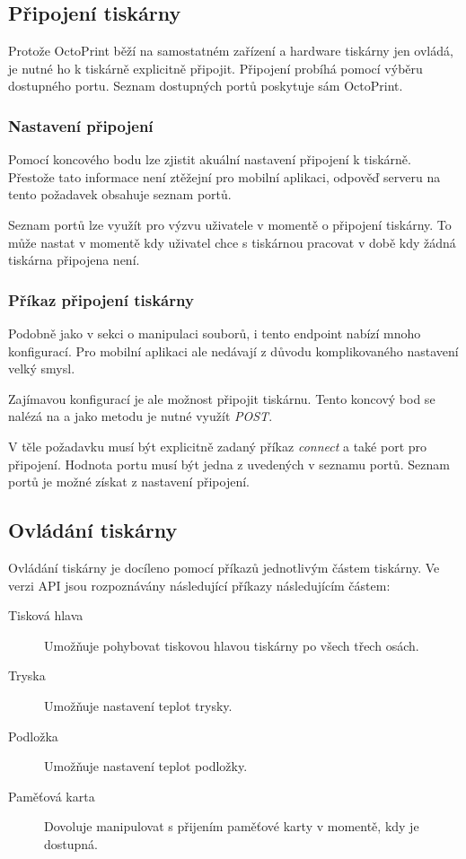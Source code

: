 \subsection{Připojení tiskárny}

Protože OctoPrint běží na samostatném zařízení a hardware tiskárny jen ovládá, je nutné ho k tiskárně explicitně připojit.
Připojení probíhá pomocí výběru dostupného portu.
Seznam dostupných portů poskytuje sám OctoPrint.

\subsubsection*{Nastavení připojení}

Pomocí koncového bodu  lze zjistit akuální nastavení připojení k tiskárně.
Přestože tato informace není ztěžejní pro mobilní aplikaci, odpověď serveru na tento požadavek obsahuje seznam portů.

Seznam portů lze využít pro výzvu uživatele v momentě o připojení tiskárny.
To může nastat v momentě kdy uživatel chce s tiskárnou pracovat v době kdy žádná tiskárna připojena není.

\subsubsection*{Příkaz připojení tiskárny}

Podobně jako v sekci o manipulaci souborů, i tento endpoint nabízí mnoho konfigurací.
Pro mobilní aplikaci ale nedávají z důvodu komplikovaného nastavení velký smysl.

Zajímavou konfigurací je ale možnost připojit tiskárnu.
Tento koncový bod se nalézá na  a jako metodu je nutné využít \textit{POST}.

V těle požadavku musí být explicitně zadaný příkaz \textit{connect} a také port pro připojení.
Hodnota portu musí být jedna z uvedených v seznamu portů.
Seznam portů je možné získat z nastavení připojení.

\subsection{Ovládání tiskárny}

Ovládání tiskárny je docíleno pomocí příkazů jednotlivým částem tiskárny.
Ve verzi API \vapi jsou rozpoznávány následující příkazy následujícím částem:

\begin{description}
	\item[Tisková hlava] Umožňuje pohybovat tiskovou hlavou tiskárny po všech třech osách.
	\item[Tryska] Umožňuje nastavení teplot trysky.
	\item[Podložka] Umožňuje nastavení teplot podložky.
	\item[Paměťová karta] Dovoluje manipulovat s přijením paměťové karty v momentě, kdy je dostupná.
\end{description}

